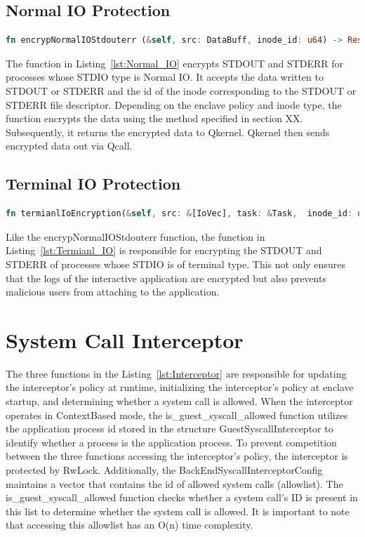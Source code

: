 \subsection{Normal IO Protection}
\begin{lstlisting}[language=rust, caption= API of normal IO shield, label={lst:Normal_IO}]
fn encrypNormalIOStdouterr (&self, src: DataBuff, inode_id: u64) -> Result<DataBuff>
\end{lstlisting}
The function in Listing~\ref{lst:Normal_IO} encrypts STDOUT and STDERR for processes whose STDIO type is Normal IO. It accepts the data written to STDOUT or STDERR and the id of the inode corresponding to the STDOUT or STDERR file descriptor. Depending on the enclave policy and inode type, the 
function encrypts the data using the method specified in section XX. Subsequently, it returns the encrypted data to Qkernel. Qkernel then sends encrypted data out via Qcall.


\subsection{Terminal IO Protection}
\begin{lstlisting}[language=rust, caption= API of system call interceptor, label={lst:Termianl_IO}]
fn termianlIoEncryption(&self, src: &[IoVec], task: &Task,  inode_id: u64) -> Result<(Vec::<IoVec>)
\end{lstlisting}
Like the encrypNormalIOStdouterr function, the function in Listing~\ref{lst:Termianl_IO} is responsible for encrypting the STDOUT and STDERR of processes whose STDIO is of terminal type. This not only ensures that the logs of the interactive application are encrypted but also prevents malicious 
users from attaching to the application.

\section{System Call Interceptor}
The three functions in the Listing~\ref{lst:Interceptor} are responsible for updating the interceptor’s policy at runtime, initializing the interceptor’s policy at enclave startup, and determining whether a system call is allowed. When the interceptor operates in ContextBased mode, 
the is\_guest\_syscall\_allowed function utilizes the application process id stored in the structure GuestSyscallInterceptor to identify whether a process is the application process. To prevent competition between the three functions accessing the interceptor's policy, the interceptor is 
protected by RwLock. Additionally, the BackEndSyscallInterceptorConfig maintains a vector that contains the id of allowed system calls (allowlist). The is\_guest\_syscall\_allowed function checks whether a system call's ID is present in this list to determine whether the system call is allowed. 
It is important to note that accessing this allowlist has an O(n) time complexity.

